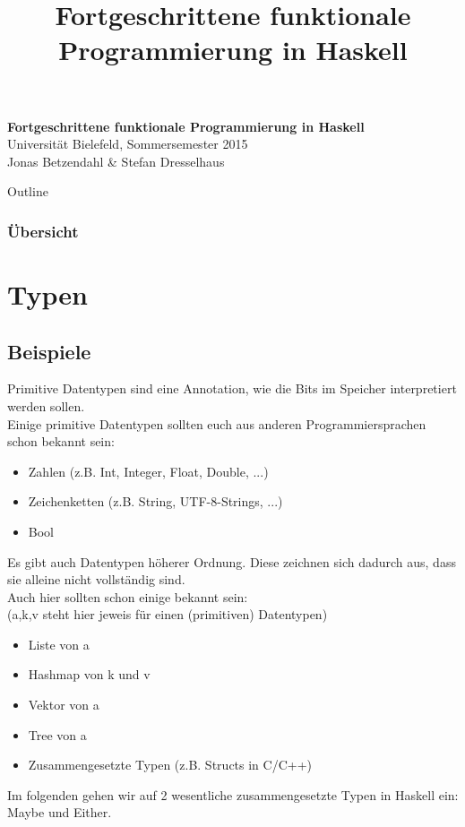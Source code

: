 \documentclass{beamer}
\title{Fortgeschrittene funktionale Programmierung in Haskell}
\begin{document}
  

  \begin{frame}
  \begin{center}
    \huge\textbf{Fortgeschrittene funktionale Programmierung in Haskell}\\ \bigskip
    \LARGE Universität Bielefeld, Sommersemester 2015\\ \bigskip
    \large Jonas Betzendahl \& Stefan Dresselhaus
    \end{center}
  \end{frame}

\begin{frame}[allowframebreaks]{Outline}
\frametitle{Übersicht}
\tableofcontents[hideallsubsections]
\end{frame}

\section{Typen}
\subsection{Beispiele}
\begin{frame}
 Primitive Datentypen sind eine Annotation, wie die Bits im Speicher interpretiert werden sollen.\\
 \pause
 Einige primitive Datentypen sollten euch aus anderen Programmiersprachen schon bekannt sein:
 \begin{itemize}
  \item Zahlen (z.B. Int, Integer, Float, Double, ...)
  \item Zeichenketten (z.B. String, UTF-8-Strings, ...)
  \item Bool
 \end{itemize}
\end{frame}

\begin{frame}
 Es gibt auch Datentypen höherer Ordnung. Diese zeichnen sich dadurch aus, dass sie alleine nicht vollständig sind.\\
 \pause
 Auch hier sollten schon einige bekannt sein:\\
 (a,k,v steht hier jeweis für einen (primitiven) Datentypen)
 \begin{itemize}
  \item Liste von a
  \item Hashmap von k und v
  \item Vektor von a
  \item Tree von a
  \item Zusammengesetzte Typen (z.B. Structs in C/C++)
 \end{itemize}
 \pause
 Im folgenden gehen wir auf 2 wesentliche zusammengesetzte Typen in Haskell ein: Maybe und Either.
\end{frame}
\end{document}
